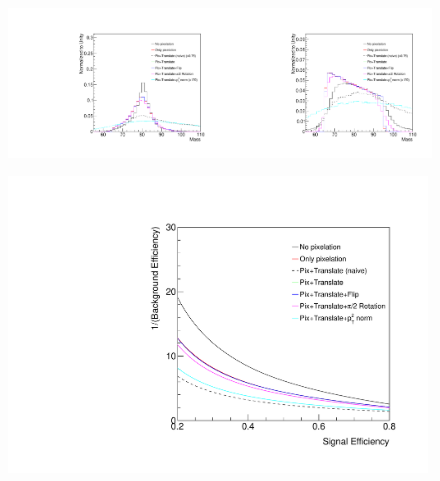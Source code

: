 \begin{figure}[bt]
  \begin{center}
        \includegraphics[width=0.5\textwidth]{figures/ImageMass_Comparison.pdf}\includegraphics[width=0.5\textwidth]{figures/ImageMass_Comparison_back.pdf}
      \caption{ 
      \label{fig:preprocess2} }
    \end{center}
\end{figure}


\begin{figure}[bt]
  \begin{center}
        \includegraphics[width=0.99\textwidth]{figures/ROCs.pdf}
      \caption{ 
      \label{fig:preprocess3} }
    \end{center}
\end{figure}

